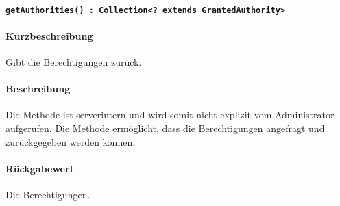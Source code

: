 \paragraph{\texttt{getAuthorities() : Collection<? extends GrantedAuthority>}}%
\paragraph*{Kurzbeschreibung}
Gibt die Berechtigungen zurück.
\paragraph*{Beschreibung}
Die Methode ist serverintern und wird somit nicht explizit vom Administrator aufgerufen.
Die Methode ermöglicht, dass die Berechtigungen angefragt und zurückgegeben werden können.
\paragraph*{Rückgabewert}
Die Berechtigungen.
